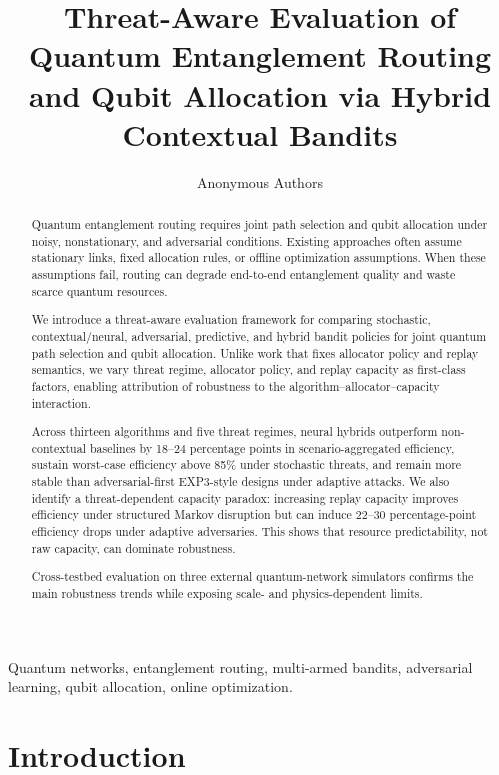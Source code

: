 \documentclass[10pt,conference]{IEEEtran}
\begin{document}
\title{Threat-Aware Evaluation of Quantum Entanglement Routing and Qubit Allocation via Hybrid Contextual Bandits}
\author{Anonymous Authors}
\maketitle

\begin{abstract}
Quantum entanglement routing requires joint path selection and qubit allocation under noisy, nonstationary, and adversarial conditions. Existing approaches often assume stationary links, fixed allocation rules, or offline optimization assumptions. When these assumptions fail, routing can degrade end-to-end entanglement quality and waste scarce quantum resources.

We introduce a threat-aware evaluation framework for comparing stochastic, contextual/neural, adversarial, predictive, and hybrid bandit policies for joint quantum path selection and qubit allocation. Unlike work that fixes allocator policy and replay semantics, we vary threat regime, allocator policy, and replay capacity as first-class factors, enabling attribution of robustness to the algorithm--allocator--capacity interaction.

Across thirteen algorithms and five threat regimes, neural hybrids outperform non-contextual baselines by 18--24 percentage points in scenario-aggregated efficiency, sustain worst-case efficiency above 85\% under stochastic threats, and remain more stable than adversarial-first EXP3-style designs under adaptive attacks. We also identify a threat-dependent capacity paradox: increasing replay capacity improves efficiency under structured Markov disruption but can induce 22--30 percentage-point efficiency drops under adaptive adversaries. This shows that resource predictability, not raw capacity, can dominate robustness.

Cross-testbed evaluation on three external quantum-network simulators confirms the main robustness trends while exposing scale- and physics-dependent limits.
\end{abstract}

\begin{IEEEkeywords}
Quantum networks, entanglement routing, multi-armed bandits, adversarial learning, qubit allocation, online optimization.
\end{IEEEkeywords}

\section{Introduction}
\end{document}
